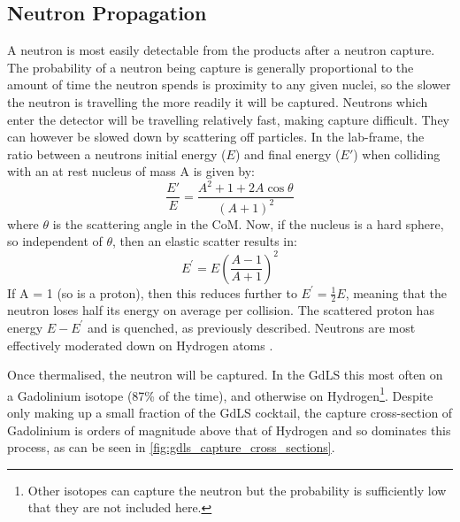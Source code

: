 

\subsection{Neutron Propagation}
\par
A neutron is most easily detectable from the products after a neutron capture.
The probability of a neutron being capture is generally proportional to the amount of time the neutron spends is proximity to any given nuclei, so the slower the neutron is travelling the more readily it will be captured.
Neutrons which enter the detector will be travelling relatively fast, making capture difficult.
They can however be slowed down by scattering off particles.
In the lab-frame, the ratio between a neutrons initial energy ($E$) and final energy ($E'$) when colliding with an at rest nucleus of mass A is given by:
\begin{equation}
    \frac{E'}{E} = \frac{A^2 + 1 + 2A\cos{\theta}}{(A + 1)^2}
\end{equation}
where $\theta$ is the scattering angle in the CoM.
Now, if the nucleus is a hard sphere, so independent of $\theta$, then an elastic scatter results in:
\begin{equation}
    E^{'} = E(\frac{A-1}{A+1})^{2}
\end{equation}
If A = 1 (so is a proton), then this reduces further to $E^{'} = \frac{1}{2}E$, meaning that the neutron loses half its energy on average per collision.
The scattered proton has energy $E - E^{'}$ and is quenched, as previously described.
Neutrons are most effectively moderated down on Hydrogen atoms \cite{neutron_thermalisation_and_capture_ref}.

\par
Once thermalised, the neutron will be captured.
In the GdLS this most often on a Gadolinium isotope (87\% of the time), and otherwise on Hydrogen\footnote{Other isotopes can capture the neutron but the probability is sufficiently low that they are not included here.}.
Despite only making up a small fraction of the GdLS cocktail, the capture cross-section of Gadolinium is orders of magnitude above that of Hydrogen and so dominates this process, as can be seen in \autoref{fig:gdls_capture_cross_sections}.



